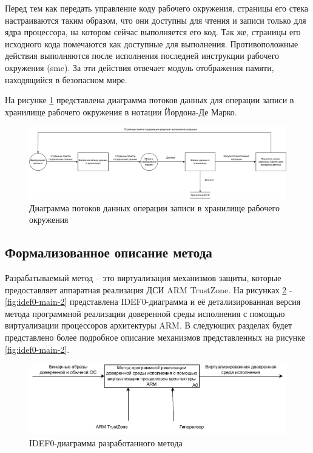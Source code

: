Перед тем как передать управление коду рабочего окружения, страницы его стека настраиваются таким образом, что они доступны для чтения и записи только для ядра процессора, на котором сейчас выполняется его код. Так же, страницы его исходного кода помечаются как доступные для выполнения. Противоположные действия выполняются после исполнения последней инструкции рабочего окружения (smc). За эти действия отвечает модуль отображения памяти, находящийся в безопасном мире.

На рисунке \ref{fig:ciee} представлена диаграмма потоков данных для операции записи в хранилище рабочего окружения в нотации Йордона-Де Марко.

\begin{figure}[h]
	\centering
	\includegraphics[width=\textwidth]{img/dfd-ciee.pdf}
	\caption{Диаграмма потоков данных операции записи в хранилище рабочего окружения}
	\label{fig:ciee}
\end{figure}

\subsection{Формализованное описание метода}

Разрабатываемый метод -- это виртуализация механизмов защиты, которые предоставляет аппаратная реализация ДСИ ARM TrustZone. На рисунках \ref{fig:idef0-main-1} - \ref{fig:idef0-main-2} представлена IDEF0-диаграмма и её детализированная версия метода программной реализации доверенной среды исполнения с помощью виртуализации процессоров архитектуры ARM. В следующих разделах будет представлено более подробное описание механизмов представленных на рисунке \ref{fig:idef0-main-2}.

\begin{figure}[h]
	\centering
	\includegraphics[width=\textwidth]{img/main-idef0-1.pdf}
	\caption{IDEF0-диаграмма разработанного метода}
	\label{fig:idef0-main-1}
\end{figure}

